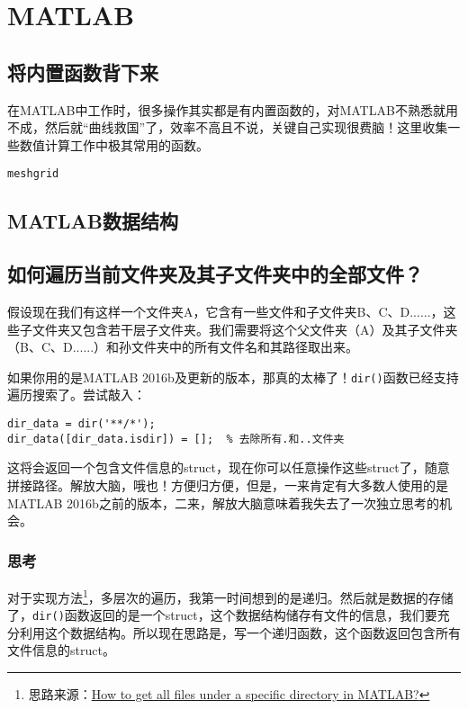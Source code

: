 \chapter{MATLAB}

\section{将内置函数背下来}

在MATLAB中工作时，很多操作其实都是有内置函数的，对MATLAB不熟悉就用不成，然后就“曲线救国”了，效率不高且不说，关键自己实现很费脑！这里收集一些数值计算工作中极其常用的函数。

\texttt{meshgrid}

\section{MATLAB数据结构}

\section{如何遍历当前文件夹及其子文件夹中的全部文件？}

假设现在我们有这样一个文件夹A，它含有一些文件和子文件夹B、C、D......，这些子文件夹又包含若干层子文件夹。我们需要将这个父文件夹（A）及其子文件夹（B、C、D......）和孙文件夹中的所有文件名和其路径取出来。

如果你用的是MATLAB 2016b及更新的版本，那真的太棒了！\texttt{dir()}函数已经支持遍历搜索了。尝试敲入：

\begin{verbatim}
dir_data = dir('**/*');
dir_data([dir_data.isdir]) = [];  % 去除所有.和..文件夹
\end{verbatim}

这将会返回一个包含文件信息的struct，现在你可以任意操作这些struct了，随意拼接路径。解放大脑，哦也！方便归方便，但是，一来肯定有大多数人使用的是MATLAB 2016b之前的版本，二来，解放大脑意味着我失去了一次独立思考的机会。

\subsection*{思考}

对于实现方法\footnote{思路来源：\href{https://stackoverflow.com/questions/2652630/how-to-get-all-files-under-a-specific-directory-in-matlab}{How to get all files under a specific directory in MATLAB?}}，多层次的遍历，我第一时间想到的是递归。然后就是数据的存储了，\texttt{dir()}函数返回的是一个struct，这个数据结构储存有文件的信息，我们要充分利用这个数据结构。所以现在思路是，写一个递归函数，这个函数返回包含所有文件信息的struct。

